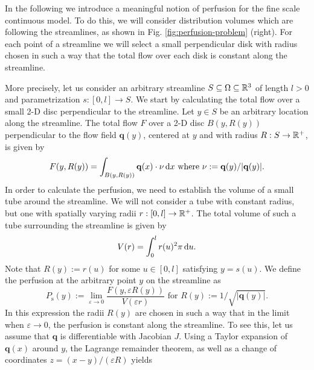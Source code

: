 \documentclass[journal,twocolumn]{IEEEtran}
\newcommand{\Perfs}{P_{\mathrm{s}}}
\newcommand{\vq}{\mathbf{q}}
\begin{document}
	In the following we introduce a meaningful notion of perfusion for the fine scale continuous model.
	To do this, we will consider distribution volumes which are following the streamlines, as shown in Fig. \ref{fig:perfusion-problem} (right). 	
	For each point of a streamline we will select a small perpendicular disk with radius chosen in such a way that the total flow over each disk is constant along the streamline.

	More precisely, let us consider an arbitrary streamline $S \subseteq \Omega \subseteq \mathbb{R}^3$ of length $l>0$ and parametrization $s:[0,l] \to S$.
	We start by calculating the total flow over a small 2-D disc perpendicular to the streamline.
	Let $y \in S$ be an arbitrary location along the streamline. 
	The total flow $F$ over a 2-D disc $B(y,R(y))$ perpendicular to the flow field $\vq(y)$, centered at $y$ and with radius $R:S\to\mathbb{R}^+$, is given by
	\begin{equation}
		F(y,R(y)) = \int_{B(y,R(y))} \vq(x) \cdot \nu \diffint x \text{ where }\nu := \vq(y)/\vert \vq(y) \vert.
		\label{eq:Fdisc}
	\end{equation}
	In order to calculate the perfusion, we need to establish the volume of a small tube around the streamline.
	We will not consider a tube with constant radius, but one with spatially varying radii $r:[0,l] \to \mathbb{R}^+$.
	The total volume of such a tube surrounding the streamline is given by
	\begin{equation}
		V(r) = \int_0^l r(u)^2 \pi \,\mathrm{d} u.
	\end{equation}
        Note that $R(y):=r(u)$ for some $u \in [0,l]$ satisfying $y=s(u)$. We define the perfusion at the arbitrary point $y$ on the streamline as
	\begin{equation}
		\Perfs(y):=  \lim_{\varepsilon \to 0} \frac{F(y,\varepsilon R(y))}{V(\varepsilon r)} \text{ for } R(y):=1/\sqrt{\vert \vq(y) \vert}.
		\label{eq:perfusiondef}
	\end{equation}
	In this expression the radii $R(y)$ are chosen in such a way that in the limit when $\varepsilon \to 0$, the perfusion is constant along the streamline. 
	To see this, let us assume that $\vq$ is differentiable with Jacobian $J$.
	Using a Taylor expansion of $\vq(x)$ around $y$, the Lagrange remainder theorem, as well as a change of coordinates $z = (x-y)/(\varepsilon R)$ yields 
\end{document}
